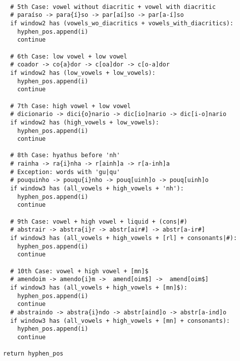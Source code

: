 \footnotesize
\begin{verbatim}
  
    # 5th Case: vowel without diacritic + vowel with diacritic
    # paraíso -> para{í}so -> par[aí]so -> par[a-í]so
    if window2 has (vowels_wo_diacritics + vowels_with_diacritics):
      hyphen_pos.append(i)
      continue
    
    # 6th Case: low vowel + low vowel
    # coador -> co{a}dor -> c[oa]dor -> c[o-a]dor
    if window2 has (low_vowels + low_vowels):
      hyphen_pos.append(i)
      continue
    
    # 7th Case: high vowel + low vowel
    # dicionario -> dici{o}nario -> dic[io]nario -> dic[i-o]nario 
    if window2 has (high_vowels + low_vowels):
      hyphen_pos.append(i)
      continue
    
    # 8th Case: hyathus before 'nh'
    # rainha -> ra{i}nha -> r[ainh]a -> r[a-inh]a
    # Exception: words with 'gu|qu'
    # pouquinho -> pouqu{i}nho -> pouq[uinh]o -> pouq[uinh]o
    if window3 has (all_vowels + high_vowels + 'nh'):
      hyphen_pos.append(i)
      continue

    # 9th Case: vowel + high vowel + liquid + (cons|#)
    # abstrair -> abstra{i}r -> abstr[air#] -> abstr[a-ir#]
    if window3 has (all_vowels + high_vowels + [rl] + consonants|#):
      hyphen_pos.append(i)
      continue
    
    # 10th Case: vowel + high vowel + [mn]$
    # amendoim -> amendo{i}m ->  amend[oim$] ->  amend[oim$]    
    if window3 has (all_vowels + high_vowels + [mn]$):
      hyphen_pos.append(i)
      continue
    # abstraindo -> abstra{i}ndo -> abstr[aind]o -> abstr[a-ind]o 
    if window3 has (all_vowels + high_vowels + [mn] + consonants):
      hyphen_pos.append(i)
      continue
    
  return hyphen_pos
\end{verbatim}